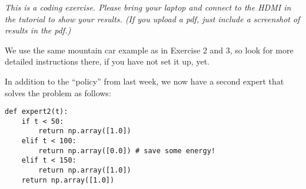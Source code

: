 







\emph{This is a coding exercise. Please bring your laptop and connect to the HDMI in the tutorial to show your results. (If you upload a pdf, just include a screenshot of results in the pdf.)}

We use the same mountain car example as in Exercise 2 and 3, so look for more detailed instructions there, if you have not set it up, yet.

In addition to the ``policy'' from last week, we now have a second expert that solves the problem as follows:
\begin{code}
\begin{Verbatim}[numbers=none,fontsize=\footnotesize]
def expert2(t):
    if t < 50:
        return np.array([1.0])
    elif t < 100:
        return np.array([0.0]) # save some energy!
    elif t < 150:
        return np.array([1.0])
    return np.array([1.0])
\end{Verbatim} 
\end{code}

